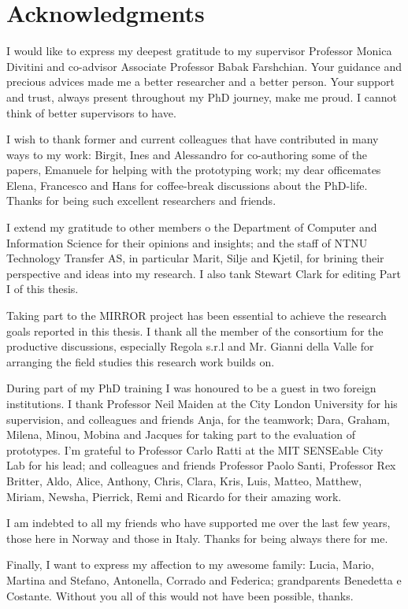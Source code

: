 \chapter{Acknowledgments}

I would like to express my deepest gratitude to my supervisor Professor Monica Divitini and co-advisor Associate Professor Babak Farshchian. Your guidance and precious advices made me a better researcher and a better person. Your support and trust, always present throughout my PhD journey, make me proud. I cannot think of better supervisors to have.

I wish to thank former and current colleagues that have contributed in many ways to my work: Birgit, Ines and Alessandro for co-authoring some of the papers, Emanuele for helping with the prototyping work; my dear officemates Elena, Francesco and Hans for coffee-break discussions about the PhD-life. Thanks for being such excellent researchers and friends. 

I extend my gratitude to other members o the Department of Computer and Information Science for their opinions and insights; and the staff of NTNU Technology Transfer AS, in particular Marit, Silje and Kjetil, for brining their perspective and ideas into my research. I also tank Stewart Clark for editing Part I of this thesis.

Taking part to the MIRROR project has been essential to achieve the research goals reported in this thesis. I thank all the member of the consortium for the productive discussions, especially Regola s.r.l and Mr. Gianni della Valle for arranging the field studies this research work builds on.

During part of my PhD training I was honoured to be a guest in two foreign institutions. I thank Professor Neil Maiden at the City London University for his supervision, and colleagues and friends Anja, for the teamwork; Dara, Graham, Milena, Minou, Mobina and Jacques for taking part to the evaluation of prototypes. I'm grateful to Professor Carlo Ratti at the MIT SENSEable City Lab for his lead; and colleagues and friends Professor Paolo Santi, Professor Rex Britter, Aldo, Alice, Anthony, Chris, Clara, Kris, Luis, Matteo, Matthew, Miriam, Newsha, Pierrick, Remi and Ricardo for their amazing work.    

I am indebted to all my friends who have supported me over the last few years,  those here in Norway and those in Italy. Thanks for being always there for me.

Finally, I want to express my affection to my awesome family: Lucia, Mario, Martina and Stefano, Antonella, Corrado and Federica; grandparents Benedetta e Costante. Without you all of this would not have been possible, thanks.



